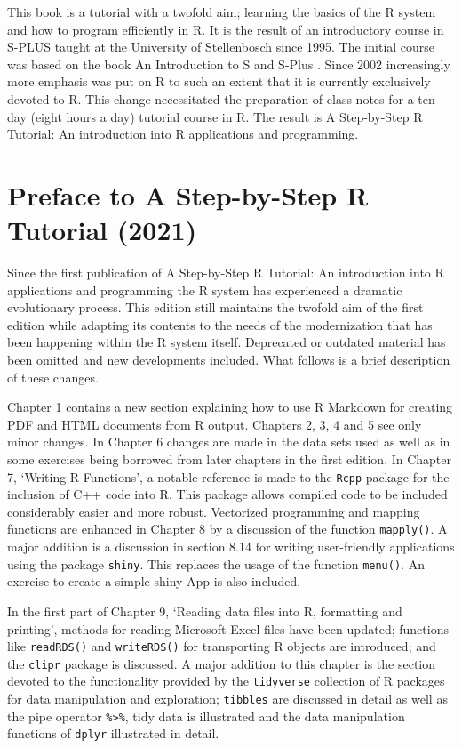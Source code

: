 \documentclass[
]{book}
\begin{document}
This book is a tutorial with a twofold aim; learning the basics of the R system and how to program efficiently in R. It is the result of an introductory course in S-PLUS taught at the University of Stellenbosch since 1995. The initial course was based on the book An Introduction to S and S-Plus \citep{Spector1994}. Since 2002 increasingly more emphasis was put on R to such an extent that it is currently exclusively devoted to R. This change necessitated the preparation of class notes for a ten-day (eight hours a day) tutorial course in R. The result is A Step-by-Step R Tutorial: An introduction into R applications and programming.

\section*{Preface to A Step-by-Step R Tutorial (2021)}\label{preface-to-a-step-by-step-r-tutorial-2021}

Since the first publication of A Step-by-Step R Tutorial: An introduction into R applications and programming the R system has experienced a dramatic evolutionary process. This edition still maintains the twofold aim of the first edition while adapting its contents to the needs of the modernization that has been happening within the R system itself. Deprecated or outdated material has been omitted and new developments included. What follows is a brief description of these changes.

Chapter 1 contains a new section explaining how to use R Markdown for creating PDF and HTML documents from R output. Chapters 2, 3, 4 and 5 see only minor changes. In Chapter 6 changes are made in the data sets used as well as in some exercises being borrowed from later chapters in the first edition. In Chapter 7, `Writing R Functions', a notable reference is made to the \texttt{Rcpp} package for the inclusion of C++ code into R. This package allows compiled code to be included considerably easier and more robust. Vectorized programming and mapping functions are enhanced in Chapter 8 by a discussion of the function \texttt{mapply()}. A major addition is a discussion in section 8.14 for writing user-friendly applications using the package \texttt{shiny}. This replaces the usage of the function \texttt{menu()}. An exercise to create a simple shiny App is also included.

In the first part of Chapter 9, `Reading data files into R, formatting and printing', methods for reading Microsoft Excel files have been updated; functions like \texttt{readRDS()} and \texttt{writeRDS()} for transporting R objects are introduced; and the \texttt{clipr} package is discussed. A major addition to this chapter is the section devoted to the functionality provided by the \texttt{tidyverse} collection of R packages for data manipulation and exploration; \texttt{tibbles} are discussed in detail as well as the pipe operator \texttt{\%\textgreater{}\%}, tidy data is illustrated and the data manipulation functions of \texttt{dplyr} illustrated in detail.
\end{document}

